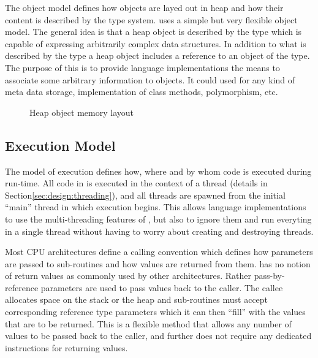 The object model defines how objects are layed out in heap and how their content
is described by the type system. \thename{} uses a simple but very flexible
object model. The general idea is that a heap object is described by the
 type which is capable of expressing arbitrarily complex data
structures. In addition to what is described by the type a heap object includes
a reference to an object of the  type. The purpose of this is to
provide language implementations the means to associate some arbitrary
information to objects. It could used for any kind of meta data storage,
implementation of class methods, polymorphism, etc.

\begin{figure}[H]
  \centering
  
  \caption{Heap object memory layout}
  \label{fig:design:heap-object-layout}
\end{figure}

\subsection{Execution Model}
The model of execution defines how, where and by whom code is executed during
run-time. All code in \thename{} is executed in the context of a thread (details
in Section\ref{sec:design:threading}), and all threads are spawned from the
initial ``main'' thread in which execution begins. This allows language
implementations to use the multi-threading features of \thename{}, but also to
ignore them and run everyting in a single thread without having to worry about
creating and destroying threads.

Most CPU architectures define a calling convention which defines how parameters
are passed to sub-routines and how values are returned from them. \thename{} has
no notion of return values as commonly used by other architectures. Rather
pass-by-reference parameters are used to pass values back to the caller. The
callee allocates space on the stack or the heap and sub-routines must accept
corresponding reference type parameters which it can then ``fill'' with the
values that are to be returned. This is a flexible method that allows any number
of values to be passed back to the caller, and further does not require any
dedicated instructions for returning values.

